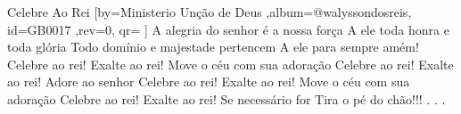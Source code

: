 \beginsong
{Celebre Ao Rei %
}[by={Ministerio Unção de Deus %
},album={@walyssondosreis},
id={GB0017 %
},rev={0}, %
qr={ %
}]
\beginverse*
A alegria do senhor é a nossa força
A ele toda honra e toda glória
Todo domínio e majestade pertencem
A ele para sempre amém!
\endverse
\beginchorus
Celebre ao rei!
Exalte ao rei!
Move o céu com sua adoração
Celebre ao rei!
Exalte ao rei!
Adore ao senhor
\endchorus
\beginchorus
Celebre ao rei!
Exalte ao rei!
Move o céu com sua adoração
Celebre ao rei!
Exalte ao rei!
Se necessário for
Tira o pé do chão!!!
\endchorus
\beginverse*
.
.
.
\endverse


